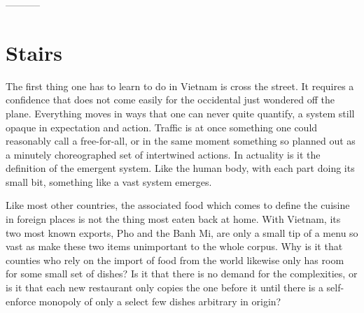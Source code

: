 \documentclass[ebook, 10pt, openright, onecolumn]{memoir}
\newcommand\td[1]{
  \todo[inline]{
     #1 
  }
}
\newcommand\finish{\td{ ----- Finish this section -----}}
\begin{document}
\finish




-----------

\chapter{Stairs}
\label{cha:stairs}

The first thing one has to learn to do in Vietnam is cross the street.  It
requires a confidence that does not come easily for the occidental just wondered
off the plane.  Everything moves in ways that one can never quite quantify, a
system still opaque in expectation and action.  Traffic is at once something one
could reasonably call a free-for-all, or in the same moment something so planned
out as a minutely choreographed set of intertwined actions.  In actuality is it
the definition of the emergent system. Like the human body, with each part doing
its small bit, something like a vast system emerges.

Like most other countries, the associated food which comes to define the cuisine
in foreign places is not the thing most eaten back at home. With Vietnam, its
two most known exports, Pho and the Banh Mi, are only a small tip of a menu so
vast as make these two items unimportant to the whole corpus.  Why is it that
counties who rely on the import of food from the world likewise only has room
for some small set of dishes?  Is it that there is no demand for the
complexities, or is it that each new restaurant only copies the one before it
until there is a self-enforce monopoly of only a select few dishes arbitrary in
origin?
\end{document}
